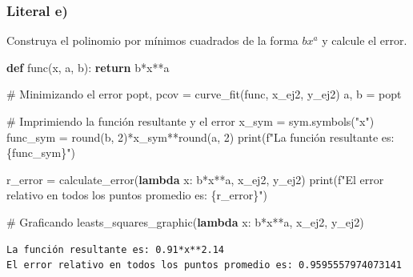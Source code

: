 \documentclass[
  letterpaper,
  DIV=11,
  numbers=noendperiod]{scrartcl}
\newenvironment{Shaded}{\begin{snugshade}}{\end{snugshade}}
\newcommand{\BuiltInTok}[1]{\textcolor[rgb]{0.00,0.23,0.31}{#1}}
\newcommand{\CommentTok}[1]{\textcolor[rgb]{0.37,0.37,0.37}{#1}}
\newcommand{\ControlFlowTok}[1]{\textcolor[rgb]{0.00,0.23,0.31}{\textbf{#1}}}
\newcommand{\DecValTok}[1]{\textcolor[rgb]{0.68,0.00,0.00}{#1}}
\newcommand{\KeywordTok}[1]{\textcolor[rgb]{0.00,0.23,0.31}{\textbf{#1}}}
\newcommand{\NormalTok}[1]{\textcolor[rgb]{0.00,0.23,0.31}{#1}}
\newcommand{\OperatorTok}[1]{\textcolor[rgb]{0.37,0.37,0.37}{#1}}
\newcommand{\SpecialCharTok}[1]{\textcolor[rgb]{0.37,0.37,0.37}{#1}}
\newcommand{\SpecialStringTok}[1]{\textcolor[rgb]{0.13,0.47,0.30}{#1}}
\newcommand{\StringTok}[1]{\textcolor[rgb]{0.13,0.47,0.30}{#1}}
\begin{document}
\subsubsection{Literal e)}\label{literal-e-1}

Construya el polinomio por mínimos cuadrados de la forma \(bx^a\) y
calcule el error.

\begin{Shaded}
\begin{Highlighting}[]

\KeywordTok{def}\NormalTok{ func(x, a, b):}
    \ControlFlowTok{return}\NormalTok{ b}\OperatorTok{*}\NormalTok{x}\OperatorTok{**}\NormalTok{a}

\CommentTok{\# Minimizando el error}
\NormalTok{popt, pcov }\OperatorTok{=}\NormalTok{ curve\_fit(func, x\_ej2, y\_ej2)}
\NormalTok{a, b }\OperatorTok{=}\NormalTok{ popt}

\CommentTok{\# Imprimiendo la función resultante y el error}
\NormalTok{x\_sym }\OperatorTok{=}\NormalTok{ sym.symbols(}\StringTok{"x"}\NormalTok{)}
\NormalTok{func\_sym }\OperatorTok{=} \BuiltInTok{round}\NormalTok{(b, }\DecValTok{2}\NormalTok{)}\OperatorTok{*}\NormalTok{x\_sym}\OperatorTok{**}\BuiltInTok{round}\NormalTok{(a, }\DecValTok{2}\NormalTok{)}
\BuiltInTok{print}\NormalTok{(}\SpecialStringTok{f"La función resultante es: }\SpecialCharTok{\{}\NormalTok{func\_sym}\SpecialCharTok{\}}\SpecialStringTok{"}\NormalTok{)}

\NormalTok{r\_error }\OperatorTok{=}\NormalTok{ calculate\_error(}\KeywordTok{lambda}\NormalTok{ x: b}\OperatorTok{*}\NormalTok{x}\OperatorTok{**}\NormalTok{a, x\_ej2, y\_ej2)}
\BuiltInTok{print}\NormalTok{(}\SpecialStringTok{f"El error relativo en todos los puntos promedio es: }\SpecialCharTok{\{}\NormalTok{r\_error}\SpecialCharTok{\}}\SpecialStringTok{"}\NormalTok{)}

\CommentTok{\# Graficando}
\NormalTok{leasts\_squares\_graphic(}\KeywordTok{lambda}\NormalTok{ x: b}\OperatorTok{*}\NormalTok{x}\OperatorTok{**}\NormalTok{a, x\_ej2, y\_ej2)}
\end{Highlighting}
\end{Shaded}

\begin{verbatim}
La función resultante es: 0.91*x**2.14
El error relativo en todos los puntos promedio es: 0.9595557974073141
\end{verbatim}
\end{document}
